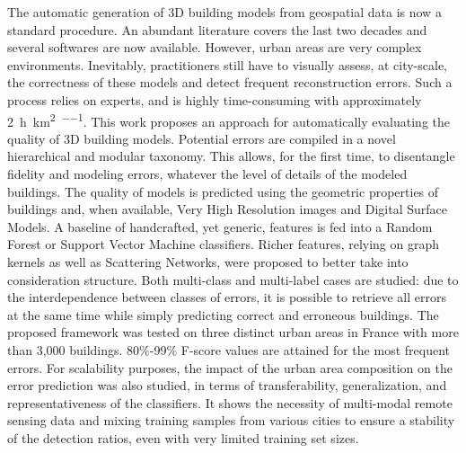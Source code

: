 The automatic generation of 3D building models from geospatial data is now a standard procedure.
An abundant literature covers the last two decades and several softwares are now available.
However, urban areas are very complex environments.
Inevitably, practitioners still have to visually assess, at city-scale, the correctness of these models and detect frequent reconstruction errors.
Such a process relies on experts, and is highly time-consuming with approximately \SI[per-mode=repeated-symbol]{2}{\hour\per\km\squared\per\expert}.
This work proposes an approach for automatically evaluating the quality of 3D building models.
Potential errors are compiled in a novel hierarchical and modular taxonomy.
This allows, for the first time, to disentangle fidelity and modeling errors, whatever the level of details of the modeled buildings.
The quality of models is predicted using the geometric properties of buildings and, when available, Very High Resolution images and Digital Surface Models.
A baseline of handcrafted, yet generic, features is fed into a Random Forest or Support Vector Machine classifiers.
Richer features, relying on graph kernels as well as Scattering Networks, were proposed to better take into consideration structure.
Both multi-class and multi-label cases are studied: due to the interdependence between classes of errors, it is possible to retrieve all errors at the same time while simply predicting correct and erroneous buildings.
The proposed framework was tested on three distinct urban areas in France with more than 3,000 buildings.
80\%-99\% F-score values are attained for the most frequent errors.
For scalability purposes, the impact of the urban area composition on the error prediction was also studied, in terms of transferability, generalization, and representativeness of the classifiers.
It shows the necessity of multi-modal remote sensing data and mixing training samples from various cities to ensure a stability of the detection ratios, even with very limited training set sizes.
